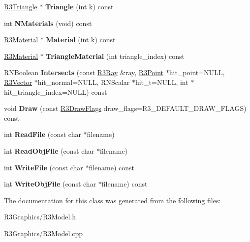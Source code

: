 \begin{DoxyCompactItemize}
\item 
\hyperlink{class_r3_triangle}{R3\+Triangle} $\ast$ {\bfseries Triangle} (int k) const \hypertarget{class_r3_model_ac71c48f63526a6878542533abcd79613}{}\label{class_r3_model_ac71c48f63526a6878542533abcd79613}

\item 
int {\bfseries N\+Materials} (void) const \hypertarget{class_r3_model_aed83008a79a44c7b76f057a77d6581da}{}\label{class_r3_model_aed83008a79a44c7b76f057a77d6581da}

\item 
\hyperlink{class_r3_material}{R3\+Material} $\ast$ {\bfseries Material} (int k) const \hypertarget{class_r3_model_a5dd87acb4921f7ddc152b4fac221be11}{}\label{class_r3_model_a5dd87acb4921f7ddc152b4fac221be11}

\item 
\hyperlink{class_r3_material}{R3\+Material} $\ast$ {\bfseries Triangle\+Material} (int triangle\+\_\+index) const \hypertarget{class_r3_model_af1233b923c3b80281b6e32fc4a6ceece}{}\label{class_r3_model_af1233b923c3b80281b6e32fc4a6ceece}

\item 
R\+N\+Boolean {\bfseries Intersects} (const \hyperlink{class_r3_ray}{R3\+Ray} \&ray, \hyperlink{class_r3_point}{R3\+Point} $\ast$hit\+\_\+point=N\+U\+LL, \hyperlink{class_r3_vector}{R3\+Vector} $\ast$hit\+\_\+normal=N\+U\+LL, R\+N\+Scalar $\ast$hit\+\_\+t=N\+U\+LL, int $\ast$hit\+\_\+triangle\+\_\+index=N\+U\+LL) const \hypertarget{class_r3_model_a999ff46636d3754a088429126a5394d1}{}\label{class_r3_model_a999ff46636d3754a088429126a5394d1}

\item 
void {\bfseries Draw} (const \hyperlink{class_r_n_flags}{R3\+Draw\+Flags} draw\+\_\+flags=R3\+\_\+\+D\+E\+F\+A\+U\+L\+T\+\_\+\+D\+R\+A\+W\+\_\+\+F\+L\+A\+GS) const \hypertarget{class_r3_model_ac1c58f0cbfee93bd8fa9be2bf1ea1432}{}\label{class_r3_model_ac1c58f0cbfee93bd8fa9be2bf1ea1432}

\item 
int {\bfseries Read\+File} (const char $\ast$filename)\hypertarget{class_r3_model_a798f1feab8d4653af2466e4cb2a53139}{}\label{class_r3_model_a798f1feab8d4653af2466e4cb2a53139}

\item 
int {\bfseries Read\+Obj\+File} (const char $\ast$filename)\hypertarget{class_r3_model_a4ee4280cd1f5077c1bfa17ef01e40da9}{}\label{class_r3_model_a4ee4280cd1f5077c1bfa17ef01e40da9}

\item 
int {\bfseries Write\+File} (const char $\ast$filename) const \hypertarget{class_r3_model_ab2b8c9ef3b145cc9c3f0aafea1e2c99b}{}\label{class_r3_model_ab2b8c9ef3b145cc9c3f0aafea1e2c99b}

\item 
int {\bfseries Write\+Obj\+File} (const char $\ast$filename) const \hypertarget{class_r3_model_a8107ccd7150a1d573aaa0fb150ed92c9}{}\label{class_r3_model_a8107ccd7150a1d573aaa0fb150ed92c9}

\end{DoxyCompactItemize}


The documentation for this class was generated from the following files\+:\begin{DoxyCompactItemize}
\item 
R3\+Graphics/R3\+Model.\+h\item 
R3\+Graphics/R3\+Model.\+cpp\end{DoxyCompactItemize}
